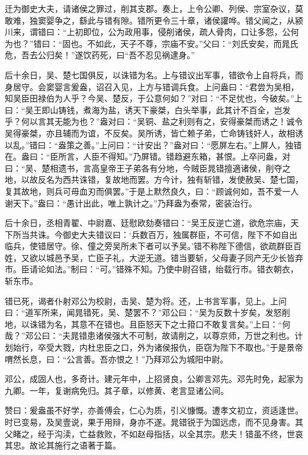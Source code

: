 \documentclass[12pt,UTF8]{ctexbook}
\begin{document}
迁为御史大夫，请诸侯之罪过，削其支郡。奏上，上令公卿、列侯、宗室杂议，莫敢难，独窦婴争之，繇此与错有隙。错所更令三十章，诸侯讙哗。错父闻之，从颍川来，谓错曰：“上初即位，公为政用事，侵削诸侯，疏人骨肉，口让多怨，公何为也？”错曰：“固也。不如此，天子不尊，宗庙不安。”父曰：“刘氏安矣，而晁氏危，吾去公归矣！”遂饮药死，曰“吾不忍见祸逮身。”



后十余日，吴、楚七国俱反，以诛错为名。上与错议出军事，错欲令上自将兵，而身居守。会窦婴言爰盎，诏召入见，上方与错调兵食。上问盎曰：“君尝为吴相，知吴臣田禄伯为人乎？今吴、楚反，于公意何如？”对曰：“不足忧也，今破矣。”上曰：“吴王即山铸钱，煮海为盐，诱天下豪桀，白头举事，此其计不百全，岂发乎？何以言其无能为也？”盎对曰：“吴铜、盐之利则有之，安得豪桀而诱之！诚令吴得豪桀，亦且辅而为谊，不反矣。吴所诱，皆亡赖子弟，亡命铸钱奸人，故相诱以乱。”错曰：“盎策之善。”上问曰：“计安出？”盎对曰：“愿屏左右。”上屏人，独错在。盎曰：“臣所言，人臣不得知。”乃屏错。错趋避东箱，甚恨。上卒问盎，对曰：“吴、楚相遗书，言高皇帝王子弟各有分地，今贼臣晁错擅適诸侯，削夺之地，以故反名为西共诛错，复故地而罢。方今计，独有斩错，发使赦吴、楚七国，复其故地，则兵可毋血刃而俱罢。”于是上默然良久，曰：“顾诚何如，吾不爱一人谢天下。”盎曰：“愚计出此，唯上孰计之。”乃拜盎为泰常，密装治行。



后十余日，丞相青翟、中尉嘉、廷慰欧劾奏错曰：“吴王反逆亡道，欲危宗庙，天下所当共诛。今御史大夫错议曰：‘兵数百万，独属群臣，不可信，陛下不如自出临兵，使错居守。徐、僮之旁吴所未下者可以予吴。’错不称陛下德信，欲疏群臣百姓，又欲以城邑予吴，亡臣子礼，大逆无道。错当要斩，父母妻子同产无少长皆弃市。臣请论如法。”制曰：“可。”错殊不知。乃使中尉召错，绐载行市。错衣朝衣，斩东市。



错已死，谒者仆射邓公为校尉，击吴、楚为将。还，上书言军事，见上。上问曰：“道军所来，闻晁错死，吴、楚罢不？”邓公曰：“吴为反数十岁矣，发怒削地，以诛错为名，其意不在错也。且臣怒天下之士箝口不敢复言矣。”上曰：“何哉？”邓公曰：“夫晁错患诸侯强大不可制，故请削之，以尊京师，万世之利也。计划始行，卒受大戮，内杜忠臣之口，外为诸侯报仇，臣窃为陛下不取也。”于是景帝喟然长息，曰：“公言善。吾亦恨之！”乃拜邓公为城阳中尉。



邓公，成固人也，多奇计。建元年中，上招贤良，公卿言邓先。邓先时免，起家为九卿。一年，复谢病免归。其子章，以修黄、老言显诸公间。



赞曰：爰盎虽不好学，亦善傅会，仁心为质，引义慷慨。遭孝文初立，资适逢世。时已变易，及吴壹说，果于用辩，身亦不遂。晁错锐于为国远虑，而不见身害。其父睹之，经于沟渎，亡益救败，不如赵母指括，以全其宗。悲夫！错虽不终，世哀其忠。故论其施行之语著于篇。
\end{document}
